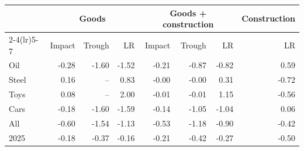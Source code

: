 \begin{tabular}{lrrrrrrr}
\toprule
 & \multicolumn{3}{c}{Goods} & \multicolumn{3}{c}{Goods + construction} & Construction \\
\cmidrule(lr){2-4}\cmidrule(lr){5-7}
 & Impact & Trough & LR & Impact & Trough & LR & LR \\
\midrule
Oil & -0.28 & -1.60 & -1.52 & -0.21 & -0.87 & -0.82 & 0.59 \\
Steel & 0.16 & -- & 0.83 & -0.00 & -0.00 & 0.31 & -0.72 \\
Toys & 0.08 & -- & 2.00 & -0.01 & -0.01 & 1.15 & -0.56 \\
Cars & -0.18 & -1.60 & -1.59 & -0.14 & -1.05 & -1.04 & 0.06 \\
All & -0.60 & -1.54 & -1.13 & -0.53 & -1.18 & -0.90 & -0.42 \\
2025 & -0.18 & -0.37 & -0.16 & -0.21 & -0.42 & -0.27 & -0.50 \\
\bottomrule
\end{tabular}
